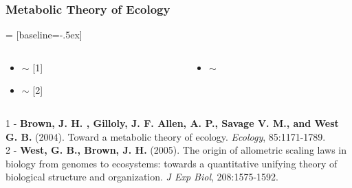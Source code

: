 \documentclass[xcolor=x11names,compress]{beamer}
\renewcommand{\(}{\begin{columns}}
\renewcommand{\)}{\end{columns}}
\newcommand{\<}[1]{\begin{column}{#1}}
\renewcommand{\>}{\end{column}}
\begin{document}
\begin{frame}
\frametitle{Metabolic Theory of Ecology}
 = [baseline=-.5ex]

\begin{columns}
  \begin{column}{0.5\textwidth}
    \begin{itemize}
	\item {} $\sim$  \tiny[1]
	\item {} $\sim$  \tiny[2]
    \end{itemize}
  \end{column}

  \begin{column}{0.5\textwidth}
     \begin{itemize}[<2->]
	\item {} $\sim$ 
     \end{itemize}
  \end{column}
\end{columns}
\vspace{1cm}
\begin{block}{}
{\footnotesize 1 - \textbf{Brown, J. H. , Gilloly, J. F. Allen, A. P., Savage V. M., and West G. B.} (2004). Toward a metabolic theory of ecology. \emph{Ecology}, 85:1171-1789.} \\
{\footnotesize 2 - \textbf{West, G. B., Brown, J. H.} (2005). The origin of allometric scaling laws in biology from genomes to ecosystems: towards a quantitative unifying theory of biological structure and organization. \emph{J Exp Biol}, 208:1575-1592.}
\end{block}
\end{frame}
\end{document}

